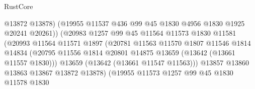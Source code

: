 \begin{lexlean}{RustCore}
\begin{coremodule}
                                        @13872
                                        @13878)
                                      (@19955
                                        @11537
                                        @436
                                        @99
                                        @45
                                        @1830
                                        @4956
                                        @1830
                                        @1925
                                        @20241
                                        @20261))
                                    (@20983
                                      @1257
                                      @99
                                      @45
                                      @11564
                                      @11573
                                      @1830
                                      @11581
                                      (@20993
                                        @11564
                                        @11571
                                        @1897
                                        (@20781
                                          @11563
                                          @11570
                                          @1807
                                          @11546
                                          @1814
                                          @14834
                                          (@20795
                                            @11556
                                            @1814
                                            @20801
                                            @14875
                                            @13659
                                            (@13642 (@13661 @11557 @1830)))
                                          @13659
                                          (@13642 (@13661 @11547 @11563)))
                                        @13857
                                        @13860
                                        @13863
                                        @13867
                                        @13872
                                        @13878)
                                      (@19955
                                        @11573
                                        @1257
                                        @99
                                        @45
                                        @1830
                                        @11578
                                        @1830

\end{coremodule}
\end{lexlean}
